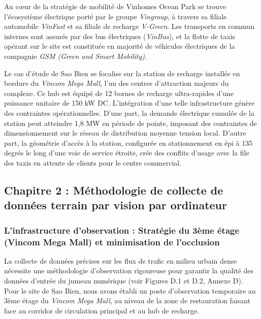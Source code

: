 \documentclass[11pt, a4paper]{article}
\begin{document}
Au cœur de la stratégie de mobilité de Vinhomes Ocean Park se trouve
l'écosystème électrique porté par le groupe \emph{Vingroup}, à travers
sa filiale automobile \emph{VinFast} et sa filiale de recharge
\emph{V-Green}. Les transports en commun internes sont assurés par des
bus électriques (\emph{VinBus}), et la flotte de taxis opérant sur le
site est constituée en majorité de véhicules électriques de la compagnie
\emph{GSM (Green and Smart Mobility)}.

Le cas d'étude de Sao Bien se focalise sur la station de recharge
installée en bordure du \emph{Vincom Mega Mall}, l'un des centres
d'attraction majeurs du complexe. Ce hub est équipé de 12 bornes de
recharge ultra-rapides d'une puissance unitaire de 150 kW DC.
L'intégration d'une telle infrastructure génère des contraintes
opérationnelles. D'une part, la demande électrique cumulée de la station
peut atteindre 1,8 MW en période de pointe, imposant des contraintes de
dimensionnement sur le réseau de distribution moyenne tension local.
D'autre part, la géométrie d'accès à la station, configurée en
stationnement en épi à 135 degrés le long d'une voie de service étroite,
crée des conflits d'usage avec la file des taxis en attente de clients
pour le centre commercial.

\newpage

\subsection{Chapitre 2 : Méthodologie de collecte de données terrain par
vision par
ordinateur}\label{chapitre-2-muxe9thodologie-de-collecte-de-donnuxe9es-terrain-par-vision-par-ordinateur}

\subsubsection{L'infrastructure d'observation : Stratégie du 3ème étage
(Vincom Mega Mall) et minimisation de
l'occlusion}\label{linfrastructure-dobservation-stratuxe9gie-du-3uxe8me-uxe9tage-vincom-mega-mall-et-minimisation-de-locclusion}

La collecte de données précises sur les flux de trafic en milieu urbain
dense nécessite une méthodologie d'observation rigoureuse pour garantir
la qualité des données d'entrée du jumeau numérique (voir Figures D.1 et
D.2, Annexe D). Pour le site de Sao Bien, nous avons établi un poste
d'observation temporaire au 3ème étage du \emph{Vincom Mega Mall}, au
niveau de la zone de restauration faisant face au corridor de
circulation principal et au hub de recharge.
\end{document}

